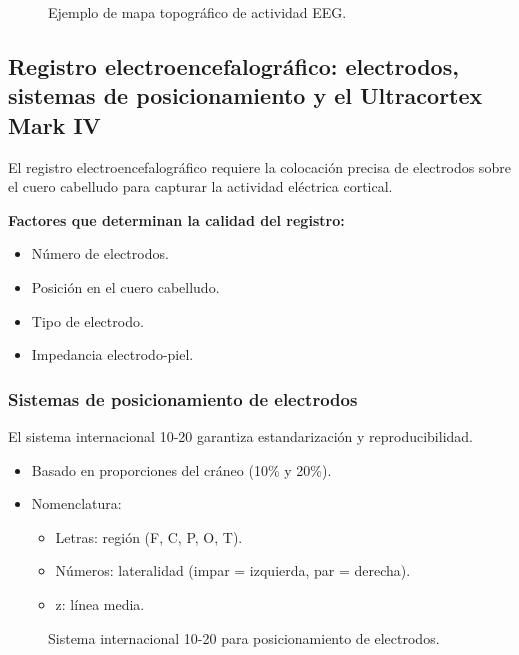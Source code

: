 \documentclass{book}
\begin{document}
\begin{figure}[H]
\centering
{}
\caption{Ejemplo de mapa topográfico de actividad EEG.}
\label{fig:topoplot_eeg}
\end{figure}

\subsection{Registro electroencefalográfico: electrodos, sistemas de posicionamiento y el Ultracortex Mark IV}

El registro electroencefalográfico requiere la colocación precisa de electrodos sobre el cuero cabelludo para capturar la actividad eléctrica cortical.

\textbf{Factores que determinan la calidad del registro:}
\begin{itemize}
    \item Número de electrodos.
    \item Posición en el cuero cabelludo.
    \item Tipo de electrodo.
    \item Impedancia electrodo-piel.
\end{itemize}

\subsubsection*{Sistemas de posicionamiento de electrodos}

El sistema internacional 10-20 garantiza estandarización y reproducibilidad.

\begin{itemize}
    \item Basado en proporciones del cráneo (10\% y 20\%).
    \item Nomenclatura:
    \begin{itemize}
        \item Letras: región (F, C, P, O, T).
        \item Números: lateralidad (impar = izquierda, par = derecha).
        \item z: línea media.
    \end{itemize}
\end{itemize}

\begin{figure}[H]
\centering
{}
\caption{Sistema internacional 10-20 para posicionamiento de electrodos.}
\label{fig:sistema_1020}
\end{figure}
\end{document}
